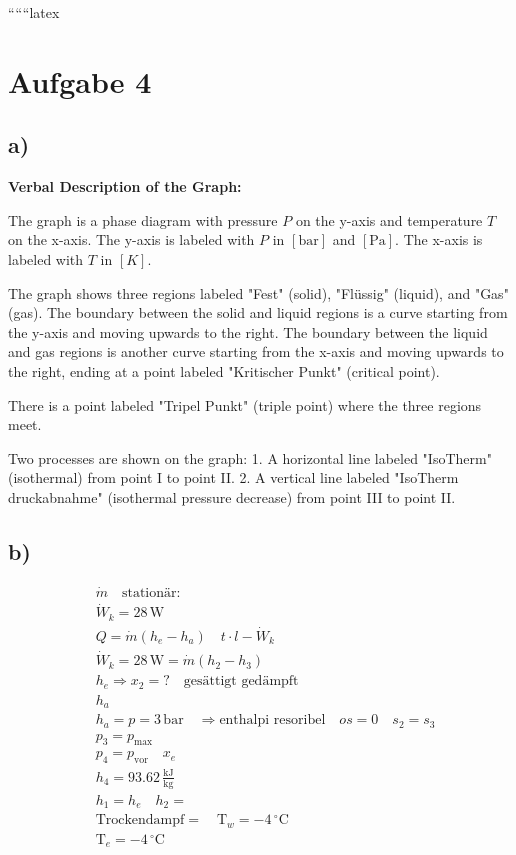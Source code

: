 
``````latex


\section*{Aufgabe 4}

\subsection*{a)}

\begin{center}
\textbf{Verbal Description of the Graph:}

The graph is a phase diagram with pressure \( P \) on the y-axis and temperature \( T \) on the x-axis. The y-axis is labeled with \( P \) in \([ \text{bar} ]\) and \([ \text{Pa} ]\). The x-axis is labeled with \( T \) in \([ K ]\). 

The graph shows three regions labeled "Fest" (solid), "Flüssig" (liquid), and "Gas" (gas). The boundary between the solid and liquid regions is a curve starting from the y-axis and moving upwards to the right. The boundary between the liquid and gas regions is another curve starting from the x-axis and moving upwards to the right, ending at a point labeled "Kritischer Punkt" (critical point). 

There is a point labeled "Tripel Punkt" (triple point) where the three regions meet. 

Two processes are shown on the graph:
1. A horizontal line labeled "IsoTherm" (isothermal) from point I to point II.
2. A vertical line labeled "IsoTherm druckabnahme" (isothermal pressure decrease) from point III to point II.

\end{center}

\subsection*{b)}

\begin{align*}
&\dot{m} \quad \text{stationär:} \\
&\dot{W}_k = 28 \, \text{W} \\
&Q = \dot{m} (h_e - h_a) \quad t \cdot l - \dot{W}_k \\
&\dot{W}_k = 28 \, \text{W} = \dot{m} (h_2 - h_3) \\
&h_e \Rightarrow x_2 = ? \quad \text{gesättigt gedämpft} \\
&h_a \\
&h_a = p = 3 \, \text{bar} \quad \Rightarrow \text{enthalpi resoribel} \quad os = 0 \quad s_2 = s_3 \\
&p_3 = p_{\text{max}} \\
&p_4 = p_{\text{vor}} \quad x_e \\
&h_4 = 93.62 \, \frac{\text{kJ}}{\text{kg}} \\
&h_1 = h_e \quad h_2 = \\
&\text{Trockendampf} = \quad \text{T}_w = -4 \, ^\circ \text{C} \\
&\text{T}_e = -4 \, ^\circ \text{C}
\end{align*}

